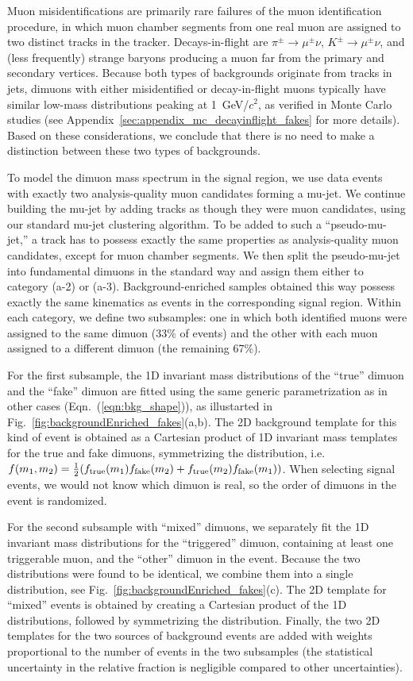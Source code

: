 Muon misidentifications are primarily rare failures of the muon
identification procedure, in which muon chamber segments from one real
muon are assigned to two distinct tracks in the tracker.
Decays-in-flight are $\pi^\pm \to \mu^\pm\nu$, $K^\pm \to \mu^\pm
\nu$, and (less frequently) strange baryons producing a muon far from
the primary and secondary vertices. Because both types of backgrounds
originate from tracks in jets, dimuons with either misidentified or
decay-in-flight muons typically have similar low-mass distributions
peaking at 1~GeV/$c^2$, as verified in Monte Carlo studies (see
Appendix~\ref{sec:appendix_mc_decayinflight_fakes} for more
details). Based on these considerations, we conclude that there is no
need to make a distinction between these two types of backgrounds.

To model the dimuon mass spectrum in the signal region, we use data
events with exactly two analysis-quality muon candidates forming a
mu-jet. We continue building the mu-jet by adding tracks as though
they were muon candidates, using our standard mu-jet clustering
algorithm. To be added to such a ``pseudo-mu-jet,'' a track has to
possess exactly the same properties as analysis-quality muon
candidates, except for muon chamber segments. We then split the
pseudo-mu-jet into fundamental dimuons in the standard way and assign
them either to category (a-2) or (a-3). Background-enriched samples
obtained this way possess exactly the same kinematics as events in the
corresponding signal region. Within each category, we define two
subsamples: one in which both identified muons were assigned to the same
dimuon (33\% of events) and the other with each muon assigned to a
different dimuon (the remaining 67\%).

For the first subsample, the 1D invariant mass distributions of the
``true'' dimuon and the ``fake'' dimuon are fitted using the same
generic parametrization as in other cases
(Eqn.~(\ref{eqn:bkg_shape})), as illustarted in
Fig.~\ref{fig:backgroundEnriched_fakes}(a,b). The 2D background
template for this kind of event is obtained as a Cartesian product of
1D invariant mass templates for the true and fake dimuons,
symmetrizing the distribution, i.e.\ $f(m_1,m_2)=\tfrac{1}{2} (f_{\mbox{\scriptsize true}}(m_1)
f_{\mbox{\scriptsize fake}}(m_2)+f_{\mbox{\scriptsize true}}(m_2) f_{\mbox{\scriptsize fake}}(m_1))$.  When selecting signal
events, we would not know which dimuon is real, so the order of
dimuons in the event is randomized.

For the second subsample with ``mixed'' dimuons, we separately fit
the 1D invariant mass distributions for the ``triggered'' dimuon,
containing at least one triggerable muon, and the ``other'' dimuon in
the event. Because the two distributions were found to be identical,
we combine them into a single distribution, see Fig.~\ref{fig:backgroundEnriched_fakes}(c). 
The 2D template for ``mixed'' events is obtained by creating a Cartesian
product of the 1D distributions, followed by symmetrizing the
distribution. Finally, the two 2D templates for the two sources of
background events are added with weights proportional to the number of
events in the two subsamples (the statistical uncertainty in the
relative fraction is negligible compared to other uncertainties).

